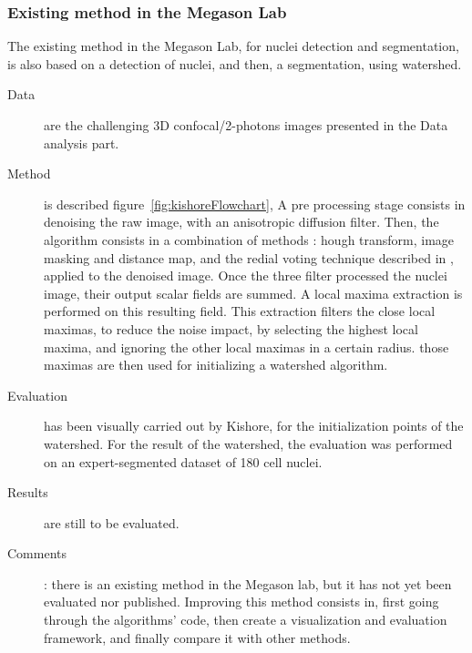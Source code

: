 \subsubsection{Existing method in the Megason Lab}
\label{sect:megasonExisting}
The existing method in the Megason Lab, for nuclei detection and segmentation, is also based on a detection of nuclei, and then, a segmentation, using watershed.
  \begin{description}
  \item[Data] are the challenging 3D confocal/2-photons images presented in the Data analysis part. 
  \item[Method] is described figure~\ref{fig:kishoreFlowchart},
  A pre processing stage consists in denoising the raw image, with an anisotropic diffusion filter.
  Then, the algorithm consists in a combination of methods : 
  hough transform, image masking and distance map, and the redial voting technique described in \cite{chang2007segmentation}, applied to the denoised image.
  Once the three filter processed the nuclei image, their output scalar fields are summed.
  A local maxima extraction is performed on this resulting field.
  This extraction filters the close local maximas, to reduce the noise impact, by selecting the highest local maxima, and ignoring the other local maximas in a certain radius.
  those maximas are then used for initializing a watershed algorithm.
  \item[Evaluation] has been visually carried out by Kishore, for the initialization points of the watershed.
  For the result of the watershed, the evaluation was performed on an expert-segmented dataset of 180 cell nuclei.
  \item[Results] are still to be evaluated.
  \item[Comments]: there is an existing method in the Megason lab, but it has not yet been evaluated nor published. Improving this method consists in, first going through the algorithms' code, then create a visualization and evaluation framework, and finally compare it with other methods.
\end{description}
